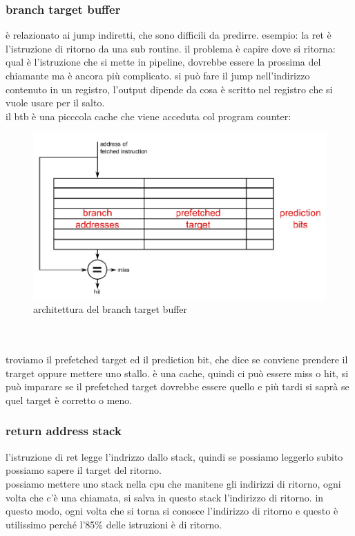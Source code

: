 \documentclass[12pt, oneside]{extbook} %
\begin{document}
\subsubsection{branch target buffer}
è relazionato ai jump indiretti, che sono difficili da predirre. esempio: la ret è l'istruzione di ritorno da una sub routine. il problema è capire dove si ritorna: qual è l'istruzione che si mette in pipeline, dovrebbe essere la prossima del chiamante ma è ancora più complicato. si può fare il jump nell'indirizzo contenuto in un registro, l'output dipende da cosa è scritto nel registro che si vuole usare per il salto.\\ il btb è una picccola cache che viene acceduta col program counter:\\
\begin{figure}
	\includegraphics[scale=0.5]{immagini/btb.png}
	\caption{architettura del branch target buffer}
\end{figure}\\\\
troviamo il prefetched target ed il prediction bit, che dice se conviene prendere il trarget oppure mettere uno stallo. è una cache, quindi ci può essere miss o hit, si può imparare se il prefetched target dovrebbe essere quello e più tardi si saprà se quel target è corretto o meno.

\subsubsection{return address stack}
l'istruzione di ret legge l'indrizzo dallo stack, quindi se possiamo leggerlo subito possiamo sapere il target del ritorno.\\ possiamo mettere uno stack nella cpu che manitene gli indirizzi di ritorno, ogni volta che c'è una chiamata, si salva in questo stack l'indirizzo di ritorno. in questo modo, ogni volta che si torna si conosce l'indirizzo di ritorno e questo è utilissimo perché l'85\% delle istruzioni è di ritorno.
\end{document}
